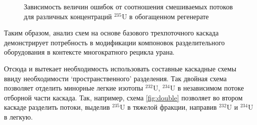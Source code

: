 \begin{figure}[ht]
  \caption{Зависимость величин ошибок от соотношения смешиваемых потоков для различных концентраций  $^{235}$U в обогащенном регенерате}\label{fig:TerminalDilution_results}
\end{figure}


Таким образом, анализ схем на основе базового трехпоточного каскада демонстрирует потребность в модификации компоновок разделительного оборудования в контексте многократного рецикла урана.

Отсюда и вытекает необходимость использовать составные каскадные схемы ввиду необходимости  `пространственного' разделения. Так двойная схема позволяет отделить минорные легкие изотопы $^{232}$U, $^{234}$U в независимом потоке отборной части каскада. Так, например, схема \ref{fig:double} позволяет во втором каскаде разделить потоки, выделив $^{235}$U в тяжелой фракции, направив $^{232}$U и $^{234}$U в легкую.

